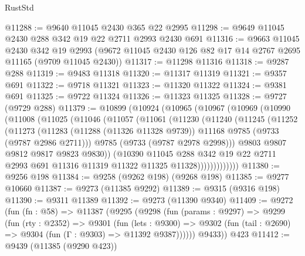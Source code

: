 \begin{lexlean}{RustStd}
\begin{coremodule}
{\begin{coremodule}
{{{{{{{{{{{{{{{{{{{{{{{{{{{{{{{{{{{{{{{{{{{{{{{{{{{{{{{@11288 := @9640 @11045 @2430 @365 @22 @2995
@11298 := @9649 @11045 @2430 @288 @342 @19 @22 @2711 @2993 @2430 @691
@11316 := @9663
    @11045
    @2430
    @342
    @19
    @2993
    (@9672 @11045 @2430 @126 @82 @17 @14 @2767 @2695 @11165 (@9709 @11045 @2430))
@11317 := @11298 @11316
@11318 := @9287 @288
@11319 := @9483 @11318
@11320 := @11317 @11319
@11321 := @9357 @691
@11322 := @9718 @11321
@11323 := @11320 @11322
@11324 := @9381 @691
@11325 := @9722 @11324
@11326 := @11323 @11325
@11328 := @9727 (@9729 @288)
@11379 := @10899
    (@10924
      (@10965
        (@10967
          (@10969
            (@10990
              (@11008
                (@11025
                  (@11046
                    (@11057
                      (@11061
                        (@11230
                          (@11240
                            (@11245
                              (@11252
                                (@11273
                                  (@11283
                                    (@11288 (@11326 @11328 @9739))
                                    @11168
                                    @9785
                                    (@9733 (@9787 @2986 @2711)))
                                  @9785
                                  (@9733 (@9787 @2978 @2998)))
                                @9803
                                @9807
                                @9812
                                @9817
                                @9823
                                @9830))
                            (@10390
                              @11045
                              @288
                              @342
                              @19
                              @22
                              @2711
                              @2993
                              @691
                              @11316
                              @11319
                              @11322
                              @11325
                              @11328)))))))))))))
@11380 := @9256 @198
@11384 := @9258 (@9262 @198) (@9268 @198)
@11385 := @9277 @10660
@11387 := @9273 (@11385 @9292)
@11389 := @9315 (@9316 @198)
@11390 := @9311 @11389
@11392 := @9273 (@11390 @9340)
@11409 := @9272
    (fun (fn : @58) =>
    @11387
      (@9295
        (@9298
          (fun (params : @9297) =>
          @9299
            (fun (rty : @2352) =>
            @9301
              (fun (lets : @9300) =>
              @9302 (fun (tail : @2690) => @9304 (fun (Γ : @9303) => @11392 @9387))))))
        @9433))
    @423
@11412 := @9439 (@11385 (@9290 @423))
}}}}}}}}}}}}}}}}}}}}}}}}}}}}}}}}}}}}}}}}}}}}}}}}}}}}}}}
\end{coremodule}}
\end{coremodule}
\end{lexlean}
